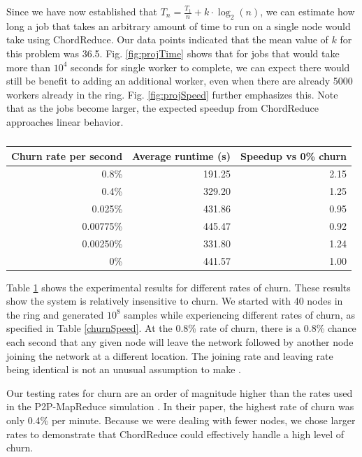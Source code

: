 Since we have now established that $T_{n} = \frac{T_{1}}{n} + k \cdot \log_{2}(n)$, we can estimate how long a job that takes an arbitrary amount of time to run on a single node would take using ChordReduce.  Our data points indicated that the mean value of $k$ for this problem was 36.5.  Fig. \ref{fig:projTime} shows that for jobs that would take more than $10^{4}$ seconds for single worker to complete, we can expect there would still be benefit to adding an additional worker, even when there are already 5000 workers already in the ring.  Fig. \ref{fig:projSpeed} further emphasizes this. Note that as the jobs become larger, the expected speedup from ChordReduce  approaches linear behavior.


\begin{table}
	\centering
	\begin{tabular}{|r|r|r|} 
		\hline 
		Churn rate per second & Average runtime (s) & Speedup vs 0\% churn\\ \hline{}
		0.8\% & 191.25 & 2.15 \\ \hline
		0.4\% & 329.20 & 1.25 \\ \hline
		0.025\% & 431.86 & 0.95 \\ \hline 
		0.00775\%  & 445.47 & 0.92 \\ \hline 
		0.00250\% & 331.80  &  1.24 \\ \hline 
		0\% & 441.57 & 1.00 \\ \hline
	\end{tabular}
	\caption{} 
	\label{tab:churnSpeed}
\end{table}


Table \ref{tab:churnSpeed} shows the experimental results for different rates of churn. These results show the system  is relatively insensitive to churn.  We started with 40 nodes in the ring and generated $10^{8}$ samples while experiencing different rates of churn, as specified in Table \ref{churnSpeed}.  At the 0.8\% rate of churn, there is a 0.8\% chance each second that any given node will leave the network followed by another node joining the network at a different location. The joining rate and leaving rate being identical is not an unusual assumption to make \cite{marozzo2012p2p} \cite{load}.  

Our testing rates for churn are an order of magnitude higher than the rates used in the P2P-MapReduce simulation  \cite{marozzo2012p2p}.  In their paper, the highest rate of churn was only 0.4\% per minute. Because we were dealing with fewer nodes, we chose larger rates to demonstrate that ChordReduce could effectively handle a high level of churn.  


